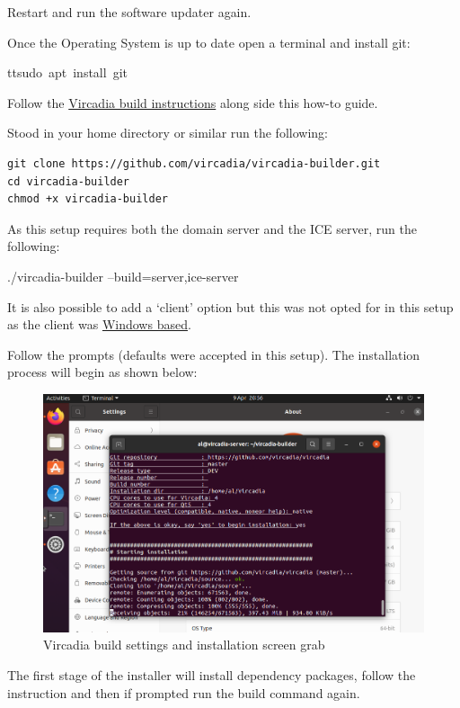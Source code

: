 Restart and run the software updater again.

Once the Operating System is up to date open a terminal and install git:

tt{sudo\ apt\ install\ git}

Follow the \href{https://github.com/vircadia/vircadia-builder}{Vircadia
build instructions} along side this how-to guide.

Stood in your home directory or similar run the following:

\begin{verbatim}
git clone https://github.com/vircadia/vircadia-builder.git
cd vircadia-builder
chmod +x vircadia-builder
\end{verbatim}

As this setup requires both the domain server and the ICE server, run
the following:

./vircadia-builder --build=server,ice-server

It is also possible to add a `client' option but this was not opted for
in this setup as the client was
\protect\hyperlink{Client-interface}{Windows based}.

Follow the prompts (defaults were accepted in this setup). The
installation process will begin as shown below:

\begin{figure}
\centering
\includegraphics{UbuntuDesktop20_04VircadiaBuildSettings.png}
\caption{Vircadia build settings and installation screen grab}
\end{figure}

The first stage of the installer will install dependency packages,
follow the instruction and then if prompted run the build command again.

